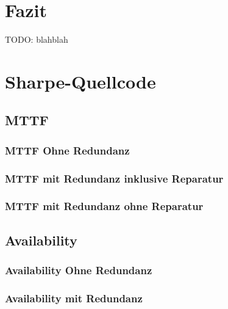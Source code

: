\documentclass[
            a4paper
            ]{scrartcl}%
\begin{document}

\section{Fazit}
TODO: blahblah
\newpage
\appendix
\section{Sharpe-Quellcode}
\subsection{MTTF}
\subsubsection{MTTF Ohne Redundanz}\label{sec:calc_mttf_simple}


\subsubsection{MTTF mit Redundanz inklusive Reparatur}\label{sec:calc_mttf_redundant_rep}


\subsubsection{MTTF mit Redundanz ohne Reparatur}\label{sec:calc_mttf_redundant}

\newpage
\subsection{Availability}
\subsubsection{Availability Ohne Redundanz}


\subsubsection{Availability mit Redundanz}

\end{document}
